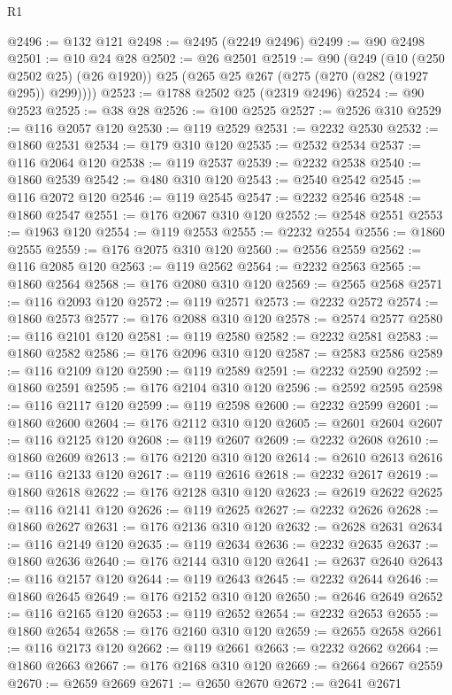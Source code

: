 \begin{lexlean}{R1}
\begin{coremodule}
@2496 := @132 @121
@2498 := @2495 (@2249 @2496)
@2499 := @90 @2498
@2501 := @10 @24 @28
@2502 := @26 @2501
@2519 := @90
    (@249
      (@10 (@250 @2502 @25) (@26 @1920))
      @25
      (@265 @25 @267 (@275 (@270 (@282 (@1927 @295)) @299))))
@2523 := @1788 @2502 @25 (@2319 @2496)
@2524 := @90 @2523
@2525 := @38 @28
@2526 := @100 @2525
@2527 := @2526 @310
@2529 := @116 @2057 @120
@2530 := @119 @2529
@2531 := @2232 @2530
@2532 := @1860 @2531
@2534 := @179 @310 @120
@2535 := @2532 @2534
@2537 := @116 @2064 @120
@2538 := @119 @2537
@2539 := @2232 @2538
@2540 := @1860 @2539
@2542 := @480 @310 @120
@2543 := @2540 @2542
@2545 := @116 @2072 @120
@2546 := @119 @2545
@2547 := @2232 @2546
@2548 := @1860 @2547
@2551 := @176 @2067 @310 @120
@2552 := @2548 @2551
@2553 := @1963 @120
@2554 := @119 @2553
@2555 := @2232 @2554
@2556 := @1860 @2555
@2559 := @176 @2075 @310 @120
@2560 := @2556 @2559
@2562 := @116 @2085 @120
@2563 := @119 @2562
@2564 := @2232 @2563
@2565 := @1860 @2564
@2568 := @176 @2080 @310 @120
@2569 := @2565 @2568
@2571 := @116 @2093 @120
@2572 := @119 @2571
@2573 := @2232 @2572
@2574 := @1860 @2573
@2577 := @176 @2088 @310 @120
@2578 := @2574 @2577
@2580 := @116 @2101 @120
@2581 := @119 @2580
@2582 := @2232 @2581
@2583 := @1860 @2582
@2586 := @176 @2096 @310 @120
@2587 := @2583 @2586
@2589 := @116 @2109 @120
@2590 := @119 @2589
@2591 := @2232 @2590
@2592 := @1860 @2591
@2595 := @176 @2104 @310 @120
@2596 := @2592 @2595
@2598 := @116 @2117 @120
@2599 := @119 @2598
@2600 := @2232 @2599
@2601 := @1860 @2600
@2604 := @176 @2112 @310 @120
@2605 := @2601 @2604
@2607 := @116 @2125 @120
@2608 := @119 @2607
@2609 := @2232 @2608
@2610 := @1860 @2609
@2613 := @176 @2120 @310 @120
@2614 := @2610 @2613
@2616 := @116 @2133 @120
@2617 := @119 @2616
@2618 := @2232 @2617
@2619 := @1860 @2618
@2622 := @176 @2128 @310 @120
@2623 := @2619 @2622
@2625 := @116 @2141 @120
@2626 := @119 @2625
@2627 := @2232 @2626
@2628 := @1860 @2627
@2631 := @176 @2136 @310 @120
@2632 := @2628 @2631
@2634 := @116 @2149 @120
@2635 := @119 @2634
@2636 := @2232 @2635
@2637 := @1860 @2636
@2640 := @176 @2144 @310 @120
@2641 := @2637 @2640
@2643 := @116 @2157 @120
@2644 := @119 @2643
@2645 := @2232 @2644
@2646 := @1860 @2645
@2649 := @176 @2152 @310 @120
@2650 := @2646 @2649
@2652 := @116 @2165 @120
@2653 := @119 @2652
@2654 := @2232 @2653
@2655 := @1860 @2654
@2658 := @176 @2160 @310 @120
@2659 := @2655 @2658
@2661 := @116 @2173 @120
@2662 := @119 @2661
@2663 := @2232 @2662
@2664 := @1860 @2663
@2667 := @176 @2168 @310 @120
@2669 := @2664 @2667 @2559
@2670 := @2659 @2669
@2671 := @2650 @2670
@2672 := @2641 @2671

\end{coremodule}
\end{lexlean}
